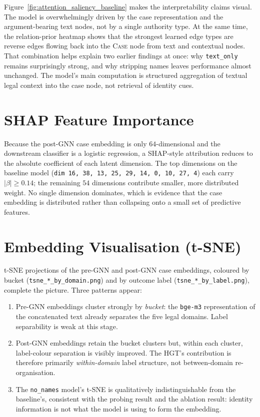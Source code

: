 {\color{blue}Figure~\ref{fig:attention_saliency_baseline} makes the
interpretability claims visual. The model is overwhelmingly driven by
the case representation and the argument-bearing text nodes, not by a
single authority type. At the same time, the relation-prior heatmap
shows that the strongest learned edge types are reverse edges flowing
back into the \textsc{Case} node from text and contextual nodes. That
combination helps explain two earlier findings at once: why
\texttt{text\_only} remains surprisingly strong, and why stripping
names leaves performance almost unchanged. The model's main computation
is structured aggregation of textual legal context into the case node,
not retrieval of identity cues.\par}

\section{SHAP Feature Importance}

Because the post-GNN case embedding is only $64$-dimensional and the
downstream classifier is a logistic regression, a SHAP-style
attribution reduces to the absolute coefficient of each latent
dimension. The top dimensions on the baseline model
(\texttt{dim~16, 38, 13, 25, 29, 14, 0, 10, 27, 4}) each carry
$|\beta|\!\ge\!0.14$; the remaining $54$ dimensions contribute smaller,
more distributed weight. No single dimension dominates, which is
evidence that the case embedding is distributed rather than
collapsing onto a small set of predictive features.

\section{Embedding Visualisation (t-SNE)}

t-SNE projections of the pre-GNN and post-GNN case embeddings, coloured
by bucket (\texttt{tsne\_*\_by\_domain.png}) and by outcome label
(\texttt{tsne\_*\_by\_label.png}), complete the picture. Three
patterns appear:

\begin{enumerate}
  \item Pre-GNN embeddings cluster strongly by \emph{bucket}: the
    \texttt{bge-m3} representation of the concatenated text already
    separates the five legal domains. Label separability is weak at
    this stage.
  \item Post-GNN embeddings retain the bucket clusters but, within
    each cluster, label-colour separation is visibly improved. The
    HGT's contribution is therefore primarily \emph{within-domain}
    label structure, not between-domain re-organisation.
  \item The \texttt{no\_names} model's t-SNE is qualitatively
    indistinguishable from the baseline's, consistent with the
    probing result and the ablation result: identity information is
    not what the model is using to form the embedding.
\end{enumerate}

